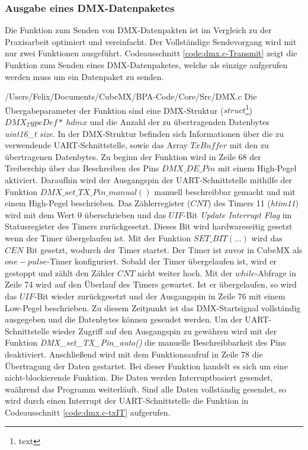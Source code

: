 \subsubsection{Ausgabe eines DMX-Datenpaketes}
Die Funktion zum Senden von DMX-Datenpakten ist im Vergleich zu der Praxisarbeit optimiert und vereinfacht. Der Vollständige Sendevorgang wird mit nur zwei Funktionen ausgeführt. Codeausschnitt \ref{code:dmx.c-Transmit} zeigt die Funktion zum Senden eines DMX-Datenpaketes, welche als einzige aufgerufen werden muss um ein Datenpaket zu senden.

{/Users/Felix/Documents/CubeMX/BPA-Code/Core/Src/DMX.c}
Die Übergabeparameter der Funktion sind eine DMX-Struktur ($struct$\footnote{text}) $DMX_TypeDef*\ hdmx$ und die Anzahl der zu übertragenden Datenbytes \textit{uint16\_t size}. In der DMX-Struktur befinden sich Informationen über die zu verwendende UART-Schnittstelle, %
sowie das Array $TxBuffer$ mit den zu übertragenen Datenbytes. Zu beginn der Funktion wird in Zeile 68 der Treiberchip über das Beschreiben des Pins $DMX\_DE\_Pin$ mit einem High-Pegel aktiviert. Daraufhin wird der Ausgangspin der UART-Schnittstelle mithilfe der Funktion $DMX\_set\_TX\_Pin\_manual()$ manuell beschreibbar gemacht und mit einem High-Pegel beschrieben.
Das Zählerregister ($CNT$) des Timers 11 (\textit{htim11}) wird mit dem Wert 0 überschrieben und das $UIF$-Bit \textit{Update Interrupt Flag} im Statusregister des Timers zurückgesetzt. Dieses Bit wird hardwareseitig gesetzt wenn der Timer übergelaufen ist. Mit der Funktion $SET\_BIT(...)$ wird das $CEN$ Bit gesetzt, wodurch der Timer startet. Der Timer ist zuvor in CubeMX als $one-pulse$-Timer%
konfiguriert. Sobald der Timer übergelaufen ist, wird er gestoppt und zählt den Zähler $CNT$ nicht weiter hoch. Mit der $while$-Abfrage in Zeile 74 wird auf den Überlauf des Timers gewartet. Ist er übergelaufen, so wird das $UIF$-Bit wieder zurückgesetzt und der Ausgangspin in Zeile 76 mit einem Low-Pegel beschrieben. Zu diesem Zeitpunkt ist das DMX-Startsignal vollständig ausgegeben und die Datenbytes können gesendet werden. Um der UART-Schnittstelle wieder Zugriff auf den Ausgangspin zu gewähren wird mit der Funktion \textit{DMX\_set\_TX\_Pin\_auto()} die manuelle Beschreibbarkeit des Pins deaktiviert. Anschließend wird mit dem Funktionsaufruf in Zeile 78 die Übertragung der Daten gestartet. Bei dieser Funktion handelt es sich um eine nicht-blockierende Funktion. Die Daten werden Interruptbasiert gesendet, waährend das Programm weiterläuft. Sind alle Daten vollständig gesendet, so wird durch einen Interrupt der UART-Schnittstelle die Funktion in Codeausschnitt \ref{code:dmx.c-txIT} aufgerufen.
